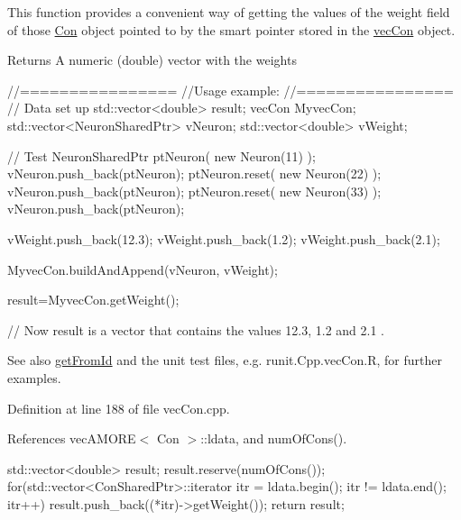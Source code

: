 This function provides a convenient way of getting the values of the weight field of those \hyperlink{class_con}{Con} object pointed to by the smart pointer stored in the \hyperlink{classvec_con}{vecCon} object. \begin{DoxyReturn}{Returns}
A numeric (double) vector with the weights
\end{DoxyReturn}

\begin{DoxyCode}
        //================
        //Usage example:
        //================
        // Data set up
                std::vector<double> result;
                vecCon MyvecCon;
                std::vector<NeuronSharedPtr> vNeuron;
                std::vector<double> vWeight;


        // Test
                NeuronSharedPtr ptNeuron( new Neuron(11) );
                vNeuron.push_back(ptNeuron);
                ptNeuron.reset( new Neuron(22) );
                vNeuron.push_back(ptNeuron);
                ptNeuron.reset( new Neuron(33) );
                vNeuron.push_back(ptNeuron);

                vWeight.push_back(12.3);
                vWeight.push_back(1.2);
                vWeight.push_back(2.1);

                MyvecCon.buildAndAppend(vNeuron, vWeight);

                result=MyvecCon.getWeight();

        // Now result is a vector that contains the values 12.3, 1.2 and 2.1 .
\end{DoxyCode}


\begin{DoxySeeAlso}{See also}
\hyperlink{classvec_con_aa9f3f5df4c4060951c975c4c829b8471}{getFromId} and the unit test files, e.g. runit.Cpp.vecCon.R, for further examples. 
\end{DoxySeeAlso}


Definition at line 188 of file vecCon.cpp.



References vecAMORE$<$ Con $>$::ldata, and numOfCons().


\begin{DoxyCode}
                                            {
        std::vector<double> result;
        result.reserve(numOfCons());
        for(std::vector<ConSharedPtr>::iterator itr = ldata.begin();   itr != 
      ldata.end();   itr++)   { result.push_back((*itr)->getWeight()); }
        return result;
}
\end{DoxyCode}


